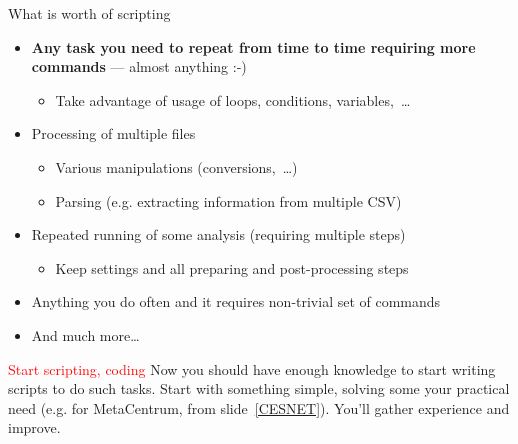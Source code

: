 \documentclass[compress, ucs, xelatex, 11pt, xcolor=svgnames, aspectratio=169,
	hyperref={
		bookmarks=true,
		unicode=true,
		colorlinks=true,
		pdftitle={Linux, command line and MetaCentrum},
		plainpages=false,
		pdfauthor={Vojtech Zeisek},
		pdfsubject={Course about use of Linux command line, writing shell scripts and using MetaCentrum of CESNET},
		pdfcreator={XeLaTeX},
		pdfkeywords={Linux, GNU, BASH, shell, command line, MetaCentrum},
		linkcolor=DarkRed, %
		anchorcolor=DarkBlue, %
		citecolor=Indigo, %
		filecolor=NavyBlue, %
		menucolor=DarkMagenta, %
		urlcolor=DarkBlue, %
		pdftex},
	url={hyphens, lowtilde} %
	]{beamer}
\renewcommand{\alert}[1]{\textcolor{red}{#1}}
\begin{document}
\begin{frame}{What is worth of scripting}
	\begin{itemize}
		\item \textbf{Any task you need to repeat from time to time requiring more commands} --- almost anything :-)
		\begin{itemize}
			\item Take advantage of usage of loops, conditions, variables,~\ldots
		\end{itemize}
		\item Processing of multiple files
		\begin{itemize}
			\item Various manipulations (conversions,~\ldots)
			\item Parsing (e.g. extracting information from multiple CSV)
		\end{itemize}
		\item Repeated running of some analysis (requiring multiple steps)
		\begin{itemize}
			\item Keep settings and all preparing and post-processing steps
		\end{itemize}
		\item Anything you do often and it requires non-trivial set of commands
		\item And much more\ldots
	\end{itemize}
	\begin{block}{\alert{Start scripting, coding}}
		Now you should have enough knowledge to start writing scripts to do such tasks. Start with something simple, solving some your practical need (e.g. for MetaCentrum, from slide~\ref{CESNET}). You'll gather experience and improve.
	\end{block}
\end{frame}
\end{document}
